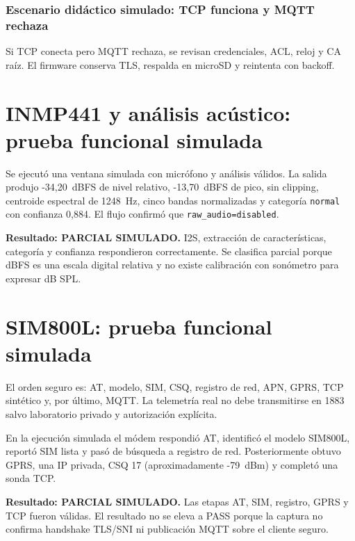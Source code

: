 \documentclass[11pt,a4paper,oneside]{report}
\begin{document}
\subsection*{Escenario didáctico simulado: TCP funciona y MQTT rechaza}
Si TCP conecta pero MQTT rechaza, se revisan credenciales, ACL, reloj y CA raíz. El
firmware conserva TLS, respalda en microSD y reintenta con backoff.

\chapter{INMP441 y análisis acústico: prueba funcional simulada}

Se ejecutó una ventana simulada con micrófono y análisis válidos. La salida produjo
-34,20~dBFS de nivel relativo, -13,70~dBFS de pico, sin clipping, centroide espectral
de 1248~Hz, cinco bandas normalizadas y categoría \texttt{normal} con confianza 0,884.
El flujo confirmó que \texttt{raw\_audio=disabled}.


\begin{vssimtest}
\textbf{Resultado: PARCIAL SIMULADO.} I2S, extracción de características, categoría y
confianza respondieron correctamente. Se clasifica parcial porque dBFS es una escala
digital relativa y no existe calibración con sonómetro para expresar dB SPL.
\end{vssimtest}

\chapter{SIM800L: prueba funcional simulada}

El orden seguro es: AT, modelo, SIM, CSQ, registro de red, APN, GPRS, TCP sintético y,
por último, MQTT. La telemetría real no debe transmitirse en 1883 salvo laboratorio
privado y autorización explícita.

En la ejecución simulada el módem respondió AT, identificó el modelo SIM800L, reportó
SIM lista y pasó de búsqueda a registro de red. Posteriormente obtuvo GPRS, una IP
privada, CSQ 17 (aproximadamente -79~dBm) y completó una sonda TCP.


\begin{vssimtest}
\textbf{Resultado: PARCIAL SIMULADO.} Las etapas AT, SIM, registro, GPRS y TCP fueron
válidas. El resultado no se eleva a PASS porque la captura no confirma handshake
TLS/SNI ni publicación MQTT sobre el cliente seguro.
\end{vssimtest}
\end{document}
